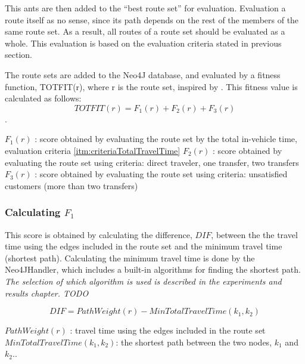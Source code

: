 This ants are then added to the ``best route set'' for evaluation. Evaluation a route itself as no sense, since its path depends on the rest of the members of the same route set. As a result, all routes of a route set should be evaluated as a whole. This evaluation is based on the evaluation criteria stated in previous section.

The route sets are added to the Neo4J database, and evaluated by a fitness function, TOTFIT(r), where r is the route set, inspired by \citep{kechagiopoulos14}.
This fitness value is calculated as follows:
$$ TOTFIT(r) = F_{1}(r) + F_{2}(r) + F_{3}(r)$$. 

$ F_{1}(r)$ : score obtained by evaluating the route set by the total in-vehicle time, evaluation criteria \ref{itm:criteriaTotalTravelTime}
\newline
$ F_{2}(r)$ : score obtained by evaluating the route set using criteria: direct traveler, one transfer, two transfers
\newline
$ F_{3}(r)$ : score obtained by evaluating the route set using criteria: unsatisfied customers (more than two transfers)
\newline

\subsubsection{Calculating $F_{1}$}

This score is obtained by calculating the difference, $DIF$, between the the travel time using the edges included in the route set and the minimum travel time (shortest path). Calculating the minimum travel time is done by the Neo4JHandler, which includes a built-in algorithms for finding the shortest path. 
\emph{\color{red} The selection of which algorithm is used is described in the experiments and results chapter. TODO}

$$ DIF = PathWeight(r) - MinTotalTravelTime(k_{1},k_{2})$$

$ PathWeight(r)$ : travel time using the edges included in the route set
\newline
$ MinTotalTravelTime(k_{1},k_{2})$: the shortest path between the two nodes, $k_{1}$ and $k_{2}$..
 

